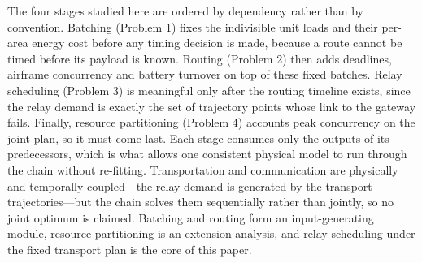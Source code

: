 \documentclass[journal]{IEEEtran}
\begin{document}
The four stages studied here are ordered by dependency rather than by
convention. Batching (Problem 1) fixes the indivisible unit loads and their
per-area energy cost before any timing decision is made, because a route
cannot be timed before its payload is known. Routing (Problem 2) then adds
deadlines, airframe concurrency and battery turnover on top of these fixed
batches. Relay scheduling (Problem 3) is meaningful only after the routing
timeline exists, since the relay demand is exactly the set of trajectory points
whose link to the gateway fails. Finally, resource partitioning (Problem 4)
accounts peak concurrency on the joint plan, so it must come last. Each stage
consumes only the outputs of its predecessors, which is what allows one
consistent physical model to run through the chain without re-fitting.
Transportation and communication are physically and temporally coupled---the
relay demand is generated by the transport trajectories---but the chain solves
them sequentially rather than jointly, so no joint optimum is claimed.
Batching and routing form an input-generating module, resource partitioning is
an extension analysis, and relay scheduling under the fixed transport plan is
the core of this paper.
\end{document}
